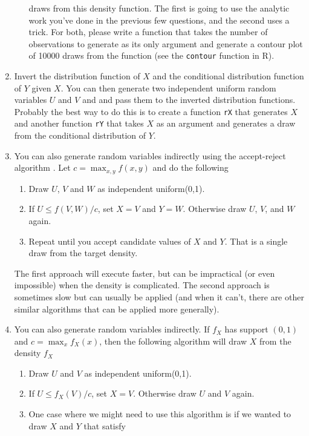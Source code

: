\begin{enumerate}
\begin{enumerate}
    draws from this density function. The first is going to use the
    analytic work you've done in the previous few questions, and the
    second uses a trick. For both, please write a function that takes
    the number of observations to generate as its only argument and
    generate a contour plot of 10000 draws from the function (see the
    \texttt{contour} function in R).
  \end{enumerate}
\item Invert the distribution function of $X$ and the conditional
  distribution function of $Y$ given $X$. You can then generate two
  independent uniform random variables $U$ and $V$ and and pass them
  to the inverted distribution functions. Probably the best way to do
  this is to create a function \texttt{rX} that generates $X$ and
  another function \texttt{rY} that takes $X$ as an argument and
  generates a draw from the conditional distribution of $Y$.
\item You can also generate random variables indirectly using the
  accept-reject algorithm \citep[Section 5.6.2]{CaB_2002}. Let $c =
  \max_{x,y} f(x,y)$ and do the following
  \begin{enumerate}
  \item Draw $U$, $V$ and $W$ as independent uniform(0,1).
  \item If $U ≤ f(V,W) / c$, set $X=V$ and $Y=W$.  Otherwise draw $U$,
    $V$, and $W$ again.
  \item Repeat until you accept candidate values of $X$ and $Y$. That
    is a single draw from the target density.
  \end{enumerate}
  The first approach will execute faster, but can be impractical (or
  even impossible) when the density is complicated. The second
  approach is sometimes slow but can usually be applied (and when it
  can't, there are other similar algorithms that can be applied more
  generally).
\item You can also generate random variables indirectly.  If $f_X$ has
  support $(0,1)$ and $c = \max_x f_X(x)$, then the following
  algorithm will draw $X$ from the density $f_X$ \citep[see][Section
  5.6.2]{CaB_2002}
  \begin{enumerate}
  \item Draw $U$ and $V$ as independent uniform(0,1).
  \item If $U ≤ f_X(V) / c$, set $X = V$.  Otherwise draw $U$ and $V$
    again.
  \item One case where we might need to use this algorithm is if we
    wanted to draw $X$ and $Y$ that satisfy

\end{enumerate}
\end{enumerate}
